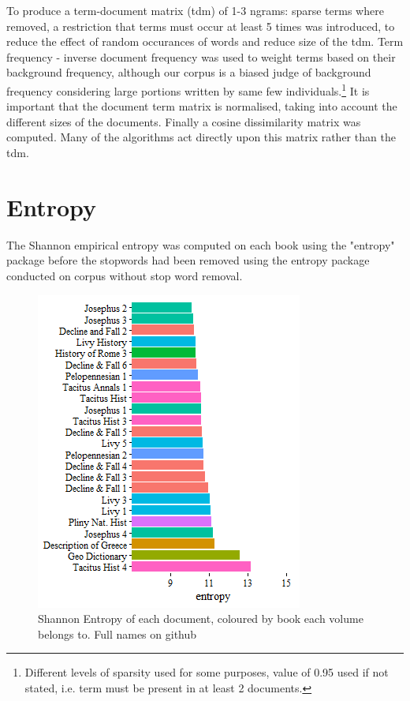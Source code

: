 \documentclass{sig-alternate-05-2015}
\begin{document}
To produce a term-document matrix (tdm) of 1-3 ngrams: sparse terms where removed, a restriction that terms must occur at least 5 times was introduced, to reduce the effect of random occurances of words and reduce size of the tdm. Term frequency - inverse document frequency was used to weight terms based on their background frequency, although our corpus is a biased judge of background frequency considering large portions written by same few individuals.\footnote{Different levels of sparsity used for some purposes, value of 0.95 used if not stated, i.e. term must be present in at least 2 documents.} It is important that the document term matrix is normalised, taking into account the different sizes of the documents. Finally a cosine dissimilarity matrix was computed. Many of the algorithms act directly upon this matrix rather than the tdm. 

\section{Entropy}
The Shannon empirical entropy \cite{shannon2001mathematical}\cite{entropy} was computed on each book using the "entropy" package before the stopwords had been removed using the entropy package conducted on corpus without stop word removal. 

\begin{figure}
\centering
\includegraphics[width=0.7\linewidth]{entropy.png}
\caption{Shannon Entropy of each document, coloured by book each volume belongs to. Full names on github}
\vskip -6pt
\label{fig:entropy}
\end{figure} 
\end{document}
